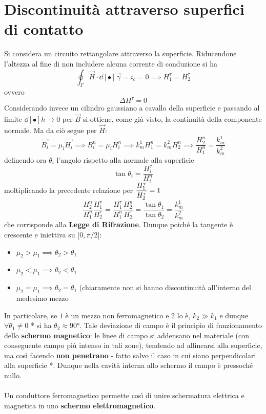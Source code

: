 \section{Discontinuità attraverso superfici di contatto}
Si considera un circuito rettangolare attraverso la superficie. Riducendone l'altezza al fine di non includere alcuna corrente di conduzione si ha
\[\oint_\Gamma \vec{H} \cdot \dd[•]{\vec{\gamma}} = i_c = 0 \implies H_1^\tau = H_2^\tau\]
ovvero
\[\Delta H^\tau = 0\]
Considerando invece un cilindro gaussiano a cavallo della superficie e passando al limite $\dd[•]{h} \rightarrow 0$ per $\vec{B}$ si ottiene, come già visto, la continuità della componente normale. Ma da ciò segue per $\vec{H}$:
\[\vec{B_i} = \mu_i \vec{H_i} \implies B_i^n = \mu_i H_i^n \implies k_m^1 H_1^n = k_m^2 H_2^n \implies \frac{H_2^n}{H_1^n} = \frac{k_m^1}{k_m^2}\]
definendo ora $\theta_i$ l'angolo rispetto alla normale alla superficie
\[\tan \theta_i = \frac{H_i^\tau}{H_i^n}\]
moltiplicando la precedente relazione per $\displaystyle \frac{H_1^\tau}{H_2^\tau} = 1$
\[\frac{H_2^n}{H_1^n} \frac{H_1^\tau}{H_2^\tau} = \frac{H_1^\tau}{H_1^n} \frac{H_2^n}{H_2^\tau} = \frac{\tan \theta_1}{\tan \theta_2} = \frac{k_m^1}{k_m^2}\]
che corrisponde alla \textbf{Legge di Rifrazione}. Dunque poiché la tangente è crescente e iniettiva su $[0, \pi/2[$:
\begin{itemize}
\item $\mu_2 > \mu_1 \implies \theta_2 > \theta_1$ 
\item $\mu_2 < \mu_1 \implies \theta_2 < \theta_1$ 
\item $\mu_2 = \mu_1 \implies \theta_2 = \theta_1$ (chiaramente non si hanno discontinuità all'interno del medesimo mezzo
\end{itemize}
In particolare, se $1$ è un mezzo non ferromagnetico e $2$ lo è, $k_2 \gg k_1$ e dunque $\forall \theta_1 \neq 0$ * si ha $\theta_2 \approx 90°$. Tale deviazione di campo è il principio di funzionamento dello \textbf{schermo magnetico}: le linee di campo si addensano nel materiale (con conseguente campo più intenso in tali zone), tendendo ad allinearsi alla superficie, ma così facendo \textbf{non penetrano} - fatto salvo il caso in cui siano perpendicolari alla superficie *. Dunque nella cavità interna allo schermo il campo è pressoché nullo. 
\\~\\
Un conduttore ferromagnetico permette così di unire schermatura elettrica e magnetica in uno \textbf{schermo elettromagnetico}.

